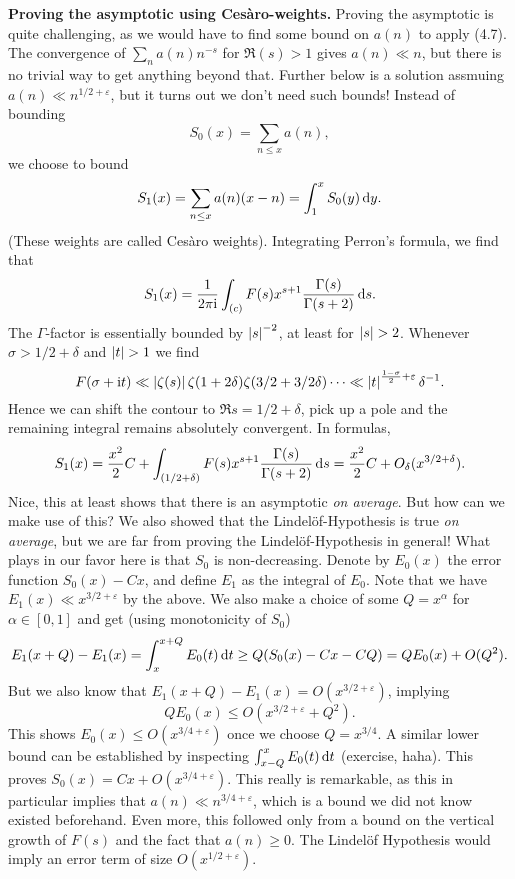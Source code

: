 \documentclass[a4paper,11pt]{article}
\begin{document}
\textbf{Proving the asymptotic using Cesàro-weights.} Proving the asymptotic is
quite challenging, as we would have to find some bound on $a(n)$ to apply (4.7).
The convergence of $\sum_n a(n)n^{-s}$ for $\Re (s)>1$ gives $a(n) \ll n$, but 
there is no trivial way to get anything beyond that.
Further below is a solution assmuing $a(n) \ll n^{1/2+\varepsilon}$, but 
it turns out we don't need such bounds! Instead of bounding 
\[
    S_0(x) = \sum_{n \leq x} a(n),
\]
we choose to bound
\[
    S_1(x) = \sum_{n \leq x} a(n) (x-n) = \int_1^x S_0(y) \mathrm{\,d} y.
\]
(These weights are called Cesàro weights). 
Integrating Perron's formula, we find that 
\[
    S_1(x) = \frac{1}{2 \pi \mathrm i} \int_{(c)} F(s) x^{s+1} \frac{\Gamma(s)}{\Gamma(s+2)} \mathrm{\,d} s.
\]
The $\Gamma$-factor is essentially bounded by $\left\lvert s \right\rvert^{-2}$, at least for 
$\left\lvert s \right\rvert > 2$. Whenever $\sigma > 1/2 + \delta$ and $\left\lvert t \right\rvert > 1$ we find  
$$F(\sigma + \mathrm i t) \ll \left\lvert \zeta(s) \right\rvert \zeta(1+2\delta) \zeta(3/2+3/2\delta) \cdots
\ll \left\lvert t \right\rvert^{\frac {1-\sigma}2 + \varepsilon} \delta^{-1}.$$
Hence we can shift the contour to $\Re s = 1/2+\delta$, pick up a pole and the 
remaining integral remains absolutely convergent. In formulas,
\[
    S_1(x) = \frac{x^2}2 C + \int_{(1/2+\delta)} F(s) x^{s+1}
    \frac{\Gamma(s)}{\Gamma(s+2)} \mathrm{\,d} s = \frac{x^2}2 C +
    O_\delta(x^{3/2+\delta}).
\]
Nice, this at least shows that there is an asymptotic \textit{on average}. But
how can we make use of this? We also showed that the Lindelöf-Hypothesis is true
\textit{on average}, but we are far from proving the Lindelöf-Hypothesis in
general! What plays in our favor here is that $S_0$ is non-decreasing. Denote
by $E_0(x)$ the error function $S_0(x) - Cx$, and define $E_1$ as the integral
of $E_0$. Note that we have $E_1(x) \ll x^{3/2+\varepsilon}$ by the above. 
We also make a choice of some $Q = x^\alpha$ for $\alpha \in [0,1]$ and get
(using monotonicity of $S_0$)
\[
    E_1(x+Q)-E_1(x) = \int_x^{x+Q} E_0(t) \mathrm{\,d} t \geq Q(S_0(x) - Cx - CQ) = QE_0(x) + O(Q^2).
\]
But we also know that $E_1(x+Q)-E_1(x) = O(x^{3/2+\varepsilon})$, implying
\[
    QE_0(x) \leq O(x^{3/2+\varepsilon}+Q^2).
\]
This shows $E_0(x) \leq O(x^{3/4+\varepsilon})$ once we choose $Q=x^{3/4}$. A similar
lower bound can be established by inspecting $\int_{x-Q}^x E_0(t) \mathrm{\,d} t$ (exercise, 
haha). This proves $S_0(x) = Cx + O(x^{3/4+\varepsilon})$. This really is remarkable,
as this in particular implies that $a(n) \ll n^{3/4 + \varepsilon}$, which is a 
bound we did not know existed beforehand. Even more, this followed only from a
bound on the vertical growth of $F(s)$ and the fact 
that $a(n) \geq 0$. The Lindelöf Hypothesis would imply an error term of 
size $O(x^{1/2+\varepsilon})$. 
\end{document}
